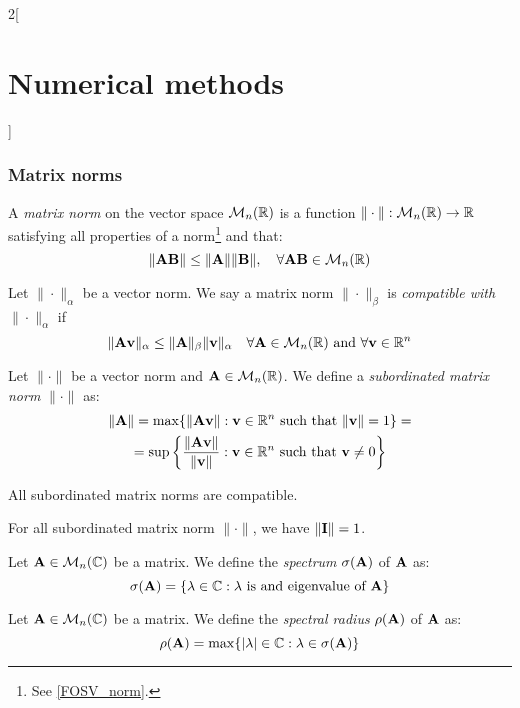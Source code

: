 \documentclass[../../../main.tex]{subfiles}
\begin{document}
\begin{multicols}{2}[\section{Numerical methods}]
  \subsubsection{Matrix norms}
  \begin{definition}
    A \emph{matrix norm} on the vector space $\mathcal{M}_n(\mathbb{R})$ is a function $\|\cdot\|:\mathcal{M}_n(\mathbb{R})\rightarrow\mathbb{R}$ satisfying all properties of a norm\footnote{See \cref{FOSV_norm}.} and that: $$\|\boldsymbol{\mathrm{A}}\boldsymbol{\mathrm{B}}\|\leq\|\boldsymbol{\mathrm{A}}\|\|\boldsymbol{\mathrm{B}}\|,\quad\forall \boldsymbol{\mathrm{A}}\boldsymbol{\mathrm{B}}\in\mathcal{M}_n(\mathbb{R})$$
  \end{definition}
  \begin{definition}
    Let $\|\cdot\|_\alpha$ be a vector norm. We say a matrix norm $\|\cdot\|_\beta$ is \emph{compatible with} $\|\cdot\|_\alpha$ if $$\|\boldsymbol{\mathrm{A}}\boldsymbol{\mathrm{v}}\|_\alpha\leq\|\boldsymbol{\mathrm{A}}\|_\beta\|\boldsymbol{\mathrm{v}}\|_\alpha\quad\forall\boldsymbol{\mathrm{A}}\in\mathcal{M}_n(\mathbb{R})\text{ and }\forall\boldsymbol{\mathrm{v}}\in\mathbb{R}^n$$
  \end{definition}
  \begin{definition}
    Let $\|\cdot\|$ be a vector norm and $\boldsymbol{\mathrm{A}}\in\mathcal{M}_n(\mathbb{R})$. We define a \emph{subordinated matrix norm} $\|\cdot\|$ as:
    \begin{multline*}
      \|\boldsymbol{\mathrm{A}}\|=\max\{\|\boldsymbol{\mathrm{A}}\boldsymbol{\mathrm{v}}\|:\boldsymbol{\mathrm{v}}\in\mathbb{R}^n\text{ such that }\|\boldsymbol{\mathrm{v}}\|=1\}=\\=\sup\left\{\frac{\|\boldsymbol{\mathrm{A}}\boldsymbol{\mathrm{v}}\|}{\|\boldsymbol{\mathrm{v}}\|}:\boldsymbol{\mathrm{v}}\in\mathbb{R}^n\text{ such that }\boldsymbol{\mathrm{v}}\ne 0\right\}
    \end{multline*}
  \end{definition}
  \begin{lemma}
    All subordinated matrix norms are compatible.
  \end{lemma}
  \begin{lemma}
    For all subordinated matrix norm $\|\cdot\|$, we have $\|\boldsymbol{\mathrm{I}}\|=1$.
  \end{lemma}
  \begin{definition}
    Let $\boldsymbol{\mathrm{A}}\in\mathcal{M}_n(\mathbb{C})$ be a matrix. We define the \emph{spectrum} $\sigma(\boldsymbol{\mathrm{A}})$ of $\boldsymbol{\mathrm{A}}$ as: $$\sigma(\boldsymbol{\mathrm{A}})=\{\lambda\in\mathbb{C}:\lambda\text{ is and eigenvalue of }\boldsymbol{\mathrm{A}}\}$$
  \end{definition}
  \begin{definition}
    Let $\boldsymbol{\mathrm{A}}\in\mathcal{M}_n(\mathbb{C})$ be a matrix. We define the \emph{spectral radius} $\rho(\boldsymbol{\mathrm{A}})$ of $\boldsymbol{\mathrm{A}}$ as: $$\rho(\boldsymbol{\mathrm{A}})=\max\{|\lambda|\in\mathbb{C}:\lambda\in\sigma(\boldsymbol{\mathrm{A}})\}$$
  \end{definition}
  \begin{proposition}

\end{proposition}
\end{multicols}
\end{document}
